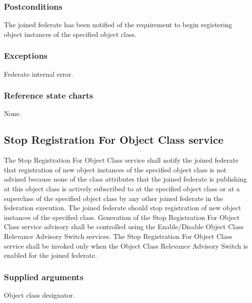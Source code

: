 \begin{compactstdpage}
    \subsubsection{Postconditions}
    \begin{stdalphalist}
        \item The joined federate has been notified of the requirement to begin registering object instances of the specified object class.
    \end{stdalphalist}

    \subsubsection{Exceptions}
    \begin{stdalphalist}
        \item Federate internal error.
    \end{stdalphalist}

    \subsubsection{Reference state charts}
    \begin{stdalphalist}
        \item None.
    \end{stdalphalist}

    \subsection{Stop Registration For Object Class \rtiinitiated{} service}

    The Stop Registration For Object Class \rtiinitiated{} service shall notify the joined federate that registration of new object instances of the specified object class is not advised because none of the class attributes that the joined federate is publishing at this object class is actively subscribed to at the specified object class or at a superclass of the specified object class by any other joined federate in the federation execution. The joined federate should stop registration of new object instances of the specified class. Generation of the Stop Registration For Object Class \rtiinitiated{} service advisory shall be controlled using the Enable/Disable Object Class Relevance Advisory Switch services. The Stop Registration For Object Class \rtiinitiated{} service shall be invoked only when the Object Class Relevance Advisory Switch is enabled for the joined federate.

    \subsubsection{Supplied arguments}
    \begin{stdalphalist}
        \item Object class designator.
    \end{stdalphalist}
\end{compactstdpage}

